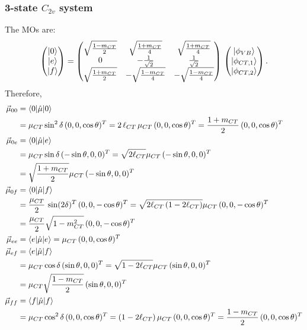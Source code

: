 \documentclass[journal=jpcafh]{achemso}
\begin{document}
\subsubsection{3-state $C_{2v}$ system}

The MOs are:\begin{equation*}
	\begin{pmatrix}
		\ket{0} \\ \ket{e} \\ \ket{f}
	\end{pmatrix} =
	\begin{pmatrix}
		\sqrt{\frac{1-m_{CT}}{2}}  & \sqrt{\frac{1+m_{CT}}{4}}  & \sqrt{\frac{1+m_{CT}}{4}} \\
		0 & -\frac{1}{\sqrt{2}} & \frac{1}{\sqrt{2}}\\
		\sqrt{\frac{1+m_{CT}}{2}} & -\sqrt{\frac{1-m_{CT}}{4}}   & -\sqrt{\frac{1-m_{CT}}{4}}  
	\end{pmatrix} \,\begin{pmatrix}
		\ket{\phi_{VB}} \\ \ket{\phi_{CT,1}} \\ \ket{\phi_{CT,2}}
	\end{pmatrix}.
\end{equation*}
Therefore,
\begin{align}
	\vec\mu_{00} &= \braket{0|\hat{\mu}|0} \nonumber\\
	&= \mu_{CT}\sin^2\delta\,(0,0,\cos\theta)^T 
	= 2\,\ell_{CT}\,\mu_{CT}\,(0,0,\cos\theta)^T
	= \frac{1+m_{CT}}{2}\,(0,0,\cos\theta)^T\\
	\vec\mu_{0e} &= \braket{0|\hat{\mu}|e} \nonumber\\
	&= \mu_{CT}\sin\delta\,(-\sin\theta, 0,0)^T
	= \sqrt{2\ell_{CT}}\mu_{CT}\,(-\sin\theta, 0,0)^T\nonumber\\
	&= \sqrt{\frac{1+m_{CT}}{2}}\mu_{CT}\,(-\sin\theta, 0,0)^T\\
	\vec\mu_{0f} &= \braket{0|\hat{\mu}|f}  \nonumber\\
	&= \frac{\mu_{CT}}{2}\,\sin(2\delta)^T\,(0,0,-\cos\theta)^T
	=\sqrt{2\ell_{CT}\,(1- 2\ell_{CT})}\mu_{CT}\,(0,0,-\cos\theta)^T\nonumber\\
	&= \frac{\mu_{CT}}{2}\sqrt{1-m_{CT}^2}\,(0,0,-\cos\theta)^T\\
	\vec\mu_{ee} &= \braket{e|\hat{\mu}|e} 
	= \mu_{CT}\,(0,0,\cos\theta)^T \\
	\vec\mu_{ef} &= \braket{e|\hat{\mu}|f} \nonumber\\
	&= \mu_{CT}\cos\delta\,(\sin\theta, 0, 0)^T
	= \sqrt{1-2\ell_{CT}}\mu_{CT}\,(\sin\theta, 0, 0)^T\nonumber\\
	&= \mu_{CT}\sqrt{\frac{1-m_{CT}}{2}}\,(\sin\theta, 0, 0)^T \\
	\vec\mu_{ff} &= \braket{f|\hat{\mu}|f} \nonumber\\
	&= \mu_{CT}\cos^2\delta\,(0,0,\cos\theta)^T
	=(1- 2\ell_{CT})\,\mu_{CT}\,(0,0,\cos\theta)^T
	= \frac{1-m_{CT}}{2}\,(0,0,\cos\theta)^T
\end{align}
\end{document}
